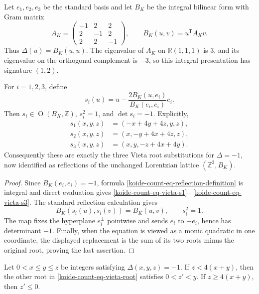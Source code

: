 Let $e_1,e_2,e_3$ be the standard basis and let $B_K$ be the integral
bilinear form with Gram matrix
\begin{equation}
 A_K=
 \begin{pmatrix}
 -1&2&2\\
 2&-1&2\\
 2&2&-1
 \end{pmatrix},
 \qquad
 B_K(u,v)=u^{\mathsf T}A_Kv.
 \label{koide-count-eq-vieta-gram}
\end{equation}
Thus $\Delta(u)=B_K(u,u)$.  The eigenvalue of $A_K$ on
$\mathbb R(1,1,1)$ is $3$, and its eigenvalue on the orthogonal complement is
$-3$, so this integral presentation has signature $(1,2)$.

\begin{proposition}
\label{koide-count-prop-vieta-reflections}
For $i=1,2,3$, define
\begin{equation}
 s_i(u)=u-
 \frac{2B_K(u,e_i)}{B_K(e_i,e_i)}e_i.
 \label{koide-count-eq-reflection-definition}
\end{equation}
Then $s_i\in\operatorname O(B_K,\mathbb Z)$,
$s_i^2=1$, and $\det s_i=-1$.  Explicitly,
\begin{align}
 s_1(x,y,z)&=(-x+4y+4z,y,z),\label{koide-count-eq-vieta-s1}\\
 s_2(x,y,z)&=(x,-y+4x+4z,z),\label{koide-count-eq-vieta-s2}\\
 s_3(x,y,z)&=(x,y,-z+4x+4y).\label{koide-count-eq-vieta-s3}
\end{align}
Consequently these are exactly the three Vieta root substitutions for
$\Delta=-1$, now identified as reflections of the unchanged Lorentzian
lattice $(\mathbb Z^3,B_K)$.
\end{proposition}

\begin{proof}
Since $B_K(e_i,e_i)=-1$, formula
\eqref{koide-count-eq-reflection-definition} is integral and direct
evaluation gives \eqref{koide-count-eq-vieta-s1}--
\eqref{koide-count-eq-vieta-s3}.  The standard reflection calculation
gives
\[
 B_K(s_i(u),s_i(v))=B_K(u,v),\qquad s_i^2=1.
\]
The map fixes the hyperplane $e_i^\perp$ pointwise and sends $e_i$ to
$-e_i$, hence has determinant $-1$.  Finally, when the equation is viewed
as a monic quadratic in one coordinate, the displayed replacement is the
sum of its two roots minus the original root, proving the last assertion.
\end{proof}

\begin{proposition}
\label{koide-count-prop-vieta-reduction}
Let \(0<x\leq y\leq z\) be integers satisfying
\(\Delta(x,y,z)=-1\).  If \(z<4(x+y)\), then the other root in
\eqref{koide-count-eq-vieta-root} satisfies \(0<z'<y\).  If
\(z\geq4(x+y)\), then \(z'\leq0\).
\end{proposition}

